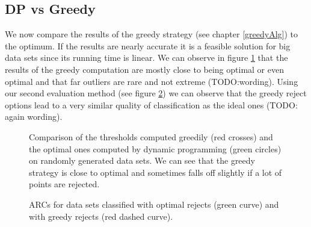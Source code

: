 \subsection{DP vs Greedy}
\label{DPvsGR}
We now compare the results of the greedy strategy (see chapter \ref{greedyAlg}) to the optimum. If the results are nearly accurate it is a feasible solution for big data sets since its running time is linear. We can observe in figure \ref{greedyEvaPareto} that the results of the greedy computation are mostly close to being optimal or even optimal and that far outliers are rare and not extreme (TODO:wording). Using our second evaluation method (see figure \ref{greedyEvaARC}) we can observe that the greedy reject options lead to a very similar quality of classification as the ideal ones (TODO: again wording).

\begin{figure}[!htbp]
\centering
\caption{Comparison of the thresholds computed greedily (red crosses) and the optimal ones computed by dynamic programming (green circles) on randomly generated data sets. We can see that the greedy strategy is close to optimal and sometimes falls off slightly if a lot of points are rejected.}
\label{greedyEvaPareto}
\end{figure}


\begin{figure}[!htbp]
\centering
\caption{ARCs for data sets classified with optimal rejects (green curve) and with greedy rejects (red dashed curve).}
\label{greedyEvaARC}
\end{figure}
